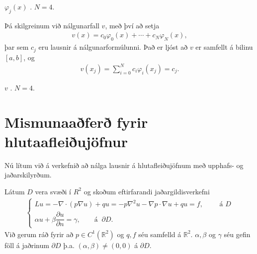 \documentclass[a4paper,10pt,icelandic]{sphinxmanual}
\begin{document}
 \(\varphi_j(x)\)  {\hyperref[\detokenize{Kafli05:example-5-1-1}]{}}  {\hyperref[\detokenize{Kafli05:example-5-2-1}]{}}.  \(N=4\).

Þá skilgreinum við nálgunarfall \(v\), með því að setja
\begin{equation*}
\begin{split}v(x)=c_0\varphi_0(x)+\cdots+c_N\varphi_N (x),\end{split}
\end{equation*}
þar sem \(c_j\) eru lausnir á nálgunarformúlunni.
Það er ljóst að \(v\) er samfellt á bilinu \([a,b]\), og
\begin{equation*}
\begin{split}v(x_j)= \sum_{i=0}^N c_i\varphi_i(x_j)= c_j.\end{split}
\end{equation*}

 \(v\)  {\hyperref[\detokenize{Kafli05:example-5-1-1}]{}}  {\hyperref[\detokenize{Kafli05:example-5-2-1}]{}}.  \(N=4\).


\section{Mismunaaðferð fyrir hlutaafleiðujöfnur}
\label{\detokenize{Kafli05:mismunaafer-fyrir-hlutaafleiujofnur}}
Nú lítum við á verkefnið að nálga lausnir á hlutafleiðujöfnum með upphafs- og jaðarskilyrðum.

Látum \(D\) vera svæði í \(R^2\) og skoðum eftirfarandi jaðargildisverkefni
\begin{equation*}
\begin{split}\begin{cases}
Lu=-\nabla\cdot (p\nabla u)+qu=
-p\nabla^2u-\nabla p\cdot \nabla u+qu=f, \qquad \text{ á } D\\
\alpha u+\beta\dfrac{\partial u}{\partial n}
=\gamma, \qquad  \text{á } \ \partial D.
\end{cases}\end{split}
\end{equation*}
Við gerum ráð fyrir að \(p\in C^1(\mathbb R^2)\) og \(q, f\) séu samfelld á \(\mathbb R^2\). \(\alpha,\beta\) og \(\gamma\) séu gefin föll á jaðrinum  \(\partial D\) þ.a. \((\alpha, \beta)\neq (0,0)\) á \(\partial D\).
\end{document}

